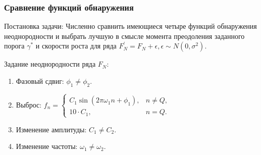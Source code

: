 \documentclass[pdf, 9pt,intlimits, unicode]{beamer}
\begin{document}
	\begin{frame}
		\frametitle{Сравнение функций обнаружения}
		
		{\color{blue} Постановка задачи:} 
		Численно сравнить имеющиеся четыре функций обнаружения неоднородности и выбрать лучшую в смысле момента преодоления заданного порога $ \gamma^* $ и скорости роста для ряда $ F_N^{'} = F_N + \epsilon, \epsilon \sim N(0, \sigma^2) $.
		
		\bigskip
		{\color{blue} Задание неоднородности ряда $ F_N $:}
		\begin{enumerate}
			\item Фазовый сдвиг: $\phi_1 \neq \phi_2$.
			\item Выброс: $f_n = 
							\begin{cases}
								C_1\sin(2\pi\omega_1n + \phi_1), & n \neq Q, \\
								10\cdot C_1, & n = Q.
							\end{cases}
						$
			\item Изменение амплитуды: $C_1 \neq C_2$.
			\item Изменение частоты: $\omega_1 \neq \omega_2$.
		\end{enumerate}
		
		
		
		
	\end{frame}
	
\end{document}

